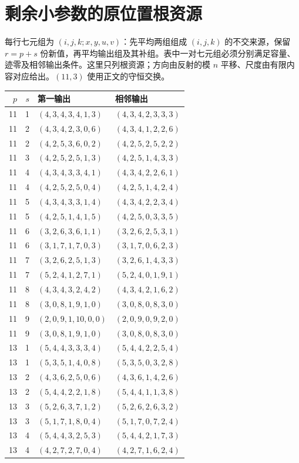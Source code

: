 \section{剩余小参数的原位置根资源}\label{sec:certificate}
每行七元组为 $(i,j,k;x,y,u,v)$：先平均两组组成 $(i,j,k)$ 的不交来源，保留 $r=p+s$ 份新值，再平均输出组及其补组。表中一对七元组必须分别满足容量、迹零及相邻输出条件。这里只列根资源；方向由反射的模 $n$ 平移、尺度由有限内容对应给出。$(11,3)$ 使用正文的守恒交换。
\small
\begin{longtable}{rrll}
\toprule $p$&$s$&第一输出&相邻输出\\\midrule\endhead
11&1&$(4,3,4,3,4,1,3)$&$(4,3,4,2,3,3,3)$\\
11&2&$(4,3,4,2,3,0,6)$&$(4,3,4,1,2,2,6)$\\
11&2&$(4,2,5,3,6,0,2)$&$(4,2,5,2,5,2,2)$\\
11&3&$(4,2,5,2,5,1,3)$&$(4,2,5,1,4,3,3)$\\
11&4&$(4,3,4,3,3,4,1)$&$(4,3,4,2,2,6,1)$\\
11&4&$(4,2,5,2,5,0,4)$&$(4,2,5,1,4,2,4)$\\
11&5&$(4,3,4,3,3,1,4)$&$(4,3,4,2,2,3,4)$\\
11&5&$(4,2,5,1,4,1,5)$&$(4,2,5,0,3,3,5)$\\
11&6&$(3,2,6,3,6,1,1)$&$(3,2,6,2,5,3,1)$\\
11&6&$(3,1,7,1,7,0,3)$&$(3,1,7,0,6,2,3)$\\
11&7&$(3,2,6,2,5,1,3)$&$(3,2,6,1,4,3,3)$\\
11&7&$(5,2,4,1,2,7,1)$&$(5,2,4,0,1,9,1)$\\
11&8&$(4,3,4,3,2,4,2)$&$(4,3,4,2,1,6,2)$\\
11&8&$(3,0,8,1,9,1,0)$&$(3,0,8,0,8,3,0)$\\
11&9&$(2,0,9,1,10,0,0)$&$(2,0,9,0,9,2,0)$\\
11&9&$(3,0,8,1,9,1,0)$&$(3,0,8,0,8,3,0)$\\
13&1&$(5,4,4,3,3,3,4)$&$(5,4,4,2,2,5,4)$\\
13&1&$(5,3,5,1,4,0,8)$&$(5,3,5,0,3,2,8)$\\
13&2&$(4,3,6,2,5,0,6)$&$(4,3,6,1,4,2,6)$\\
13&2&$(5,4,4,2,2,1,8)$&$(5,4,4,1,1,3,8)$\\
13&3&$(5,2,6,3,7,1,2)$&$(5,2,6,2,6,3,2)$\\
13&3&$(5,1,7,1,8,0,4)$&$(5,1,7,0,7,2,4)$\\
13&4&$(5,4,4,3,2,5,3)$&$(5,4,4,2,1,7,3)$\\
13&4&$(4,2,7,2,7,0,4)$&$(4,2,7,1,6,2,4)$\\

\end{longtable}
